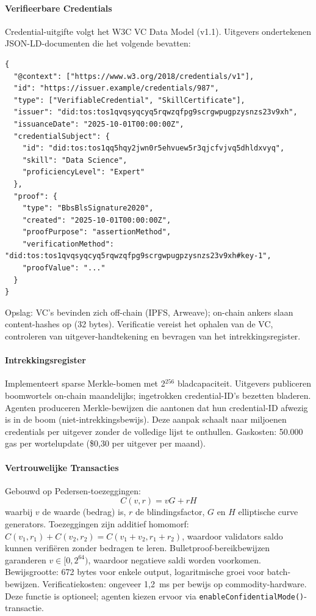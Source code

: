 \documentclass[11pt]{article}
\begin{document}
\paragraph{Verifieerbare Credentials} Credential-uitgifte volgt het W3C VC Data Model (v1.1). Uitgevers ondertekenen JSON-LD-documenten die het volgende bevatten:
\begin{verbatim}
{
  "@context": ["https://www.w3.org/2018/credentials/v1"],
  "id": "https://issuer.example/credentials/987",
  "type": ["VerifiableCredential", "SkillCertificate"],
  "issuer": "did:tos:tos1qvqsyqcyq5rqwzqfpg9scrgwpugpzysnzs23v9xh",
  "issuanceDate": "2025-10-01T00:00:00Z",
  "credentialSubject": {
    "id": "did:tos:tos1qq5hqy2jwn0r5ehvuew5r3qjcfvjvq5dhldxvyq",
    "skill": "Data Science",
    "proficiencyLevel": "Expert"
  },
  "proof": {
    "type": "BbsBlsSignature2020",
    "created": "2025-10-01T00:00:00Z",
    "proofPurpose": "assertionMethod",
    "verificationMethod": "did:tos:tos1qvqsyqcyq5rqwzqfpg9scrgwpugpzysnzs23v9xh#key-1",
    "proofValue": "..."
  }
}
\end{verbatim}
Opslag: VC's bevinden zich off-chain (IPFS, Arweave); on-chain ankers slaan content-hashes op (32 bytes). Verificatie vereist het ophalen van de VC, controleren van uitgever-handtekening en bevragen van het intrekkingsregister.

\paragraph{Intrekkingsregister} Implementeert sparse Merkle-bomen met 2$^{256}$ bladcapaciteit. Uitgevers publiceren boomwortels on-chain maandelijks; ingetrokken credential-ID's bezetten bladeren. Agenten produceren Merkle-bewijzen die aantonen dat hun credential-ID afwezig is in de boom (niet-intrekkingsbewijs). Deze aanpak schaalt naar miljoenen credentials per uitgever zonder de volledige lijst te onthullen. Gaskosten: 50.000 gas per wortelupdate (\$0,30 per uitgever per maand).

\paragraph{Vertrouwelijke Transacties} Gebouwd op Pedersen-toezeggingen:
\begin{equation}
C(v, r) = vG + rH
\end{equation}
waarbij $v$ de waarde (bedrag) is, $r$ de blindingsfactor, $G$ en $H$ elliptische curve generators. Toezeggingen zijn additief homomorf: $C(v_1, r_1) + C(v_2, r_2) = C(v_1 + v_2, r_1 + r_2)$, waardoor validators saldo kunnen verifiëren zonder bedragen te leren. Bulletproof-bereikbewijzen garanderen $v \in [0, 2^{64})$, waardoor negatieve saldi worden voorkomen. Bewijsgrootte: 672 bytes voor enkele output, logaritmische groei voor batch-bewijzen. Verificatiekosten: ongeveer 1,2~ms per bewijs op commodity-hardware. Deze functie is optioneel; agenten kiezen ervoor via \texttt{enableConfidentialMode()}-transactie.
\end{document}
